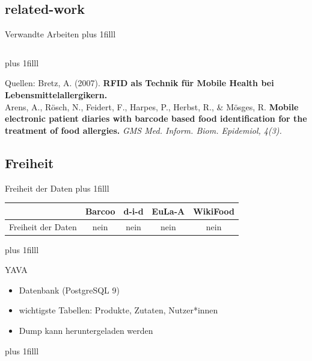 \documentclass{beamer}
\begin{document}
\subsection*{related-work}
\begin{frame}{Verwandte Arbeiten}
	\vskip0pt plus 1filll
	\begin{columns}
			\centering
			\centering
	\end{columns}

	\begin{columns}
		\column{.50\textwidth}
			\centering
		\column{.50\textwidth}
			\centering
	\end{columns}

	\vskip0pt plus 1filll
	\par\hrulefill\par
	\tiny{Quellen:
    Bretz, A. (2007). \textbf{RFID als Technik für Mobile Health bei
	Lebensmittelallergikern.}}\\
    Arens, A., Rösch, N., Feidert, F., Harpes, P., Herbst, R., \&
    Mösges, R. \textbf{Mobile electronic patient diaries with barcode based
    food identification for the treatment of food allergies.} \textit{GMS Med.
    Inform. Biom. Epidemiol, 4(3).}
\end{frame}

\subsection*{Freiheit}
\begin{frame}{Freiheit der Daten}
	\vskip0pt plus 1filll
		\begin{tabular}{|c|c|c|c|c|}
				\hline
				& Barcoo & d-i-d & EuLa-A & WikiFood\\
				\hline
			Freiheit der Daten & nein & nein & nein & nein\\
				\hline
		\end{tabular}

	\vskip0pt plus 1filll
	\begin{exampleblock}{YAVA}
		\begin{itemize}
			\item Datenbank (PostgreSQL 9)
			\item wichtigste Tabellen: Produkte, Zutaten, Nutzer*innen
			\item Dump kann heruntergeladen werden
		\end{itemize}
	\end{exampleblock}
	
	\vskip0pt plus 1filll
\end{frame}
\end{document}
